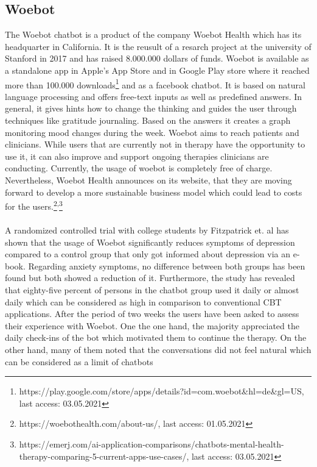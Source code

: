 \documentclass[sigconf, nonacm]{acmart}
\begin{document}
\subsection{Woebot}
The Woebot chatbot is a product of the company Woebot Health which has its headquarter in California. It is the reusult of a resarch 
project at the university of Stanford in 2017 and has raised 8.000.000 dollars of funds.
Woebot is available as a standalone app in Apple's App Store and in Google Play store where it reached more than 100.000 downloads\footnote{https://play.google.com/store/apps/details?id=com.woebot\&hl=de\&gl=US, last access: 03.05.2021} and as 
a facebook chatbot. It is based on natural language processing and offers free-text inputs as well as predefined answers.
In general, it gives hints how to change the thinking and guides the user through techniques like gratitude journaling. 
Based on the answers it creates a graph monitoring mood changes during the week.
Woebot aims to reach patients and clinicians. While users that are currently not in therapy have the opportunity to use it,
it can also improve and support ongoing therapies clinicians are conducting.
Currently, the usage of woebot is completely free of charge. Nevertheless, Woebot Health announces on its website, that they are moving forward
to develop a more sustainable business model which could lead to costs for the users.\footnote{https://woebothealth.com/about-us/, last access: 01.05.2021}\textsuperscript{,}\footnote{https://emerj.com/ai-application-comparisons/chatbots-mental-health-therapy-comparing-5-current-apps-use-cases/, last access: 03.05.2021}
\\\\
A randomized controlled trial with college students by Fitzpatrick et. al has shown that the usage of Woebot significantly reduces
symptoms of depression compared to a control group that only got informed about depression via an e-book. Regarding anxiety symptoms, no difference between
both groups has been found but both showed a reduction of it. Furthermore, the study has revealed that eighty-five percent of persons in the chatbot group used 
it daily or almost daily which can be considered as high in comparison to conventional CBT applications\cite{Ludden2015}.
After the period of two weeks the users have been asked to assess their experience with Woebot. One the one hand, the majority appreciated the daily check-ins of the bot 
which motivated them to continue the therapy. On the other hand, many of them noted that the conversations did not feel natural which can be considered as a limit of chatbots
\end{document}
